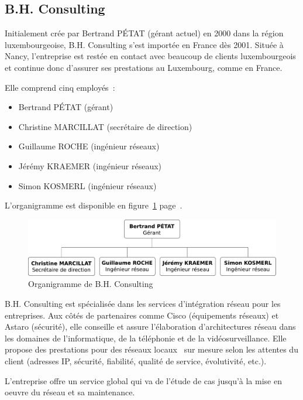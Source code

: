 \subsection{B.H. Consulting}

Initialement crée par Bertrand PÉTAT (gérant actuel) en 2000 dans la région luxembourgeoise, B.H. Consulting s'est importée en France dès 2001. Située à Nancy, l'entreprise est restée en contact avec beaucoup de clients luxembourgeois et continue donc d'assurer ses prestations au Luxembourg, comme en France.

Elle comprend cinq employés~:

\begin{itemize}
\item Bertrand PÉTAT (gérant)
\item Christine MARCILLAT (secrétaire de direction)
\item Guillaume ROCHE (ingénieur réseaux)
\item Jérémy KRAEMER (ingénieur réseaux)
\item Simon KOSMERL (ingénieur réseaux)
\end{itemize}

L'organigramme est disponible en figure~\ref{organigramme} page~\pageref{organigramme}.

\begin{figure}[!h]
	\begin{center}
		\includegraphics[width=\textwidth]{img/organigramme.pdf}
	\end{center}
	\caption{Organigramme de B.H. Consulting}
	\label{organigramme}
\end{figure}

B.H. Consulting est spécialisée dans les services d'intégration réseau pour les entreprises. Aux côtés de partenaires comme Cisco (équipements réseaux) et Astaro (sécurité), elle conseille et assure l'élaboration d'architectures réseau dans les domaines de l'informatique, de la téléphonie et de la vidéosurveillance. Elle propose des prestations pour des réseaux locaux \og~sur mesure\fg{} selon les attentes du client (adresses IP, sécurité, fiabilité, qualité de service, évolutivité, etc.).

L’entreprise offre un service global qui va de l’étude de cas jusqu’à la mise en oeuvre du réseau et sa maintenance.

